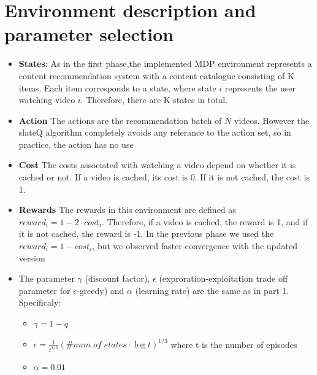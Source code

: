 \documentclass[12pt]{article}
\begin{document}
\section*{{\bf Environment description and parameter selection}}
\begin{itemize}
    \item {\bf States}: As in the first phase,the implemented MDP environment represents a content recommendation system with a content
    catalogue consisting of K items. Each item corresponds to a state, where state $i$ represents the user
    watching video $i$. Therefore, there are K states in total.
    \item {\bf Action} The actions are the recommendation batch of $N$ videos. However the slateQ algorithm completely avoids any referance to the action set, so in practice, the action has no use
    \item {\bf Cost} The costs associated with watching a video depend on whether it is cached or not. If a video is
    cached, its cost is 0. If it is not cached, the cost is 1.
    \item {\bf Rewards} The rewards in this environment are defined as $reward_i = 1 - 2\cdot cost_i$. Therefore, if a video is cached,
    the reward is 1, and if it is not cached, the reward is -1. In the previous phase we used the $reward_i = 1 - cost_i$, but we observed faster convergence with the updated version
    \item   The parameter $\gamma$ (discount factor), $\epsilon$ (exproration-exploitation trade off parameter for $\epsilon$-greedy) and $\alpha$ (learning rate) are the same as in part 1. Specificaly:
    \begin{itemize}
        \item $\gamma = 1-q$
        \item $\epsilon = \frac{1}{t^{1/3}}(\#num \;of \;states\cdot \log t )^{1/3} $  where t is the number of episodes
        \item $\alpha = 0.01$
    \end{itemize}
   
\end{itemize}
 
\end{document}
